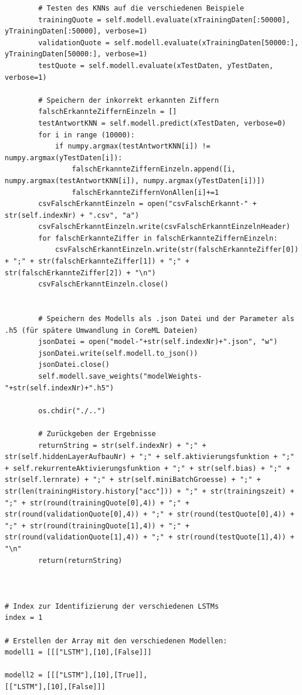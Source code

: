 \documentclass[a4paper,12pt,ngerman,oneside]{scrreprt}	%
\begin{document}
{\begin{lstlisting}
		# Testen des KNNs auf die verschiedenen Beispiele
		trainingQuote = self.modell.evaluate(xTrainingDaten[:50000], yTrainingDaten[:50000], verbose=1)
		validationQuote = self.modell.evaluate(xTrainingDaten[50000:], yTrainingDaten[50000:], verbose=1)
		testQuote = self.modell.evaluate(xTestDaten, yTestDaten, verbose=1)
		
		# Speichern der inkorrekt erkannten Ziffern
		falschErkannteZiffernEinzeln = []
		testAntwortKNN = self.modell.predict(xTestDaten, verbose=0)
		for i in range (10000):
			if numpy.argmax(testAntwortKNN[i]) != numpy.argmax(yTestDaten[i]):
				falschErkannteZiffernEinzeln.append([i, numpy.argmax(testAntwortKNN[i]), numpy.argmax(yTestDaten[i])])
				falschErkannteZiffernVonAllen[i]+=1
		csvFalschErkanntEinzeln = open("csvFalschErkannt-" + str(self.indexNr) + ".csv", "a")
		csvFalschErkanntEinzeln.write(csvFalschErkanntEinzelnHeader)
		for falschErkannteZiffer in falschErkannteZiffernEinzeln:
			csvFalschErkanntEinzeln.write(str(falschErkannteZiffer[0]) + ";" + str(falschErkannteZiffer[1]) + ";" + str(falschErkannteZiffer[2]) + "\n")
		csvFalschErkanntEinzeln.close()
		
		
		# Speichern des Modells als .json Datei und der Parameter als .h5 (für spätere Umwandlung in CoreML Dateien)
		jsonDatei = open("model-"+str(self.indexNr)+".json", "w")
		jsonDatei.write(self.modell.to_json())
		jsonDatei.close()
		self.modell.save_weights("modelWeights-"+str(self.indexNr)+".h5")
		
		os.chdir("./..")
		
		# Zurückgeben der Ergebnisse
		returnString = str(self.indexNr) + ";" + str(self.hiddenLayerAufbauNr) + ";" + self.aktivierungsfunktion + ";" + self.rekurrenteAktivierungsfunktion + ";" + str(self.bias) + ";" + str(self.lernrate) + ";" + str(self.miniBatchGroesse) + ";" + str(len(trainingHistory.history["acc"])) + ";" + str(trainingszeit) + ";" + str(round(trainingQuote[0],4)) + ";" + str(round(validationQuote[0],4)) + ";" + str(round(testQuote[0],4)) + ";" + str(round(trainingQuote[1],4)) + ";" + str(round(validationQuote[1],4)) + ";" + str(round(testQuote[1],4)) + "\n"
		return(returnString)
	


# Index zur Identifizierung der verschiedenen LSTMs
index = 1

# Erstellen der Array mit den verschiedenen Modellen:
modell1 = [[["LSTM"],[10],[False]]]

modell2 = [[["LSTM"],[10],[True]],
[["LSTM"],[10],[False]]]


\end{lstlisting}}
\end{document}
